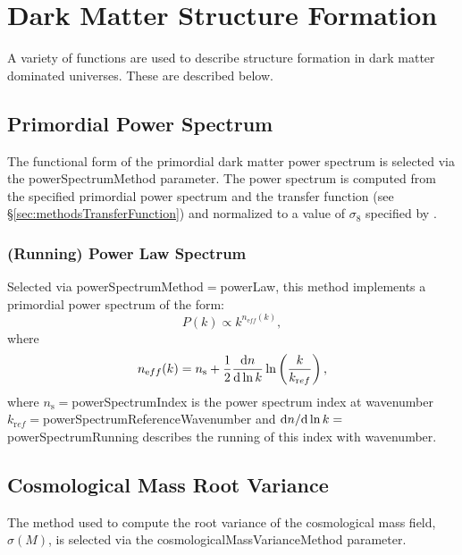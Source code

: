 \section{Dark Matter Structure Formation}

A variety of functions are used to describe structure formation in dark matter dominated universes. These are described below.

\subsection{Primordial Power Spectrum}\label{sec:PrimordialPowerSpectrum}

The functional form of the primordial dark matter power spectrum is selected via the {\normalfont \ttfamily powerSpectrumMethod} parameter. The power spectrum is computed from the specified primordial power spectrum and the transfer function (see \S\ref{sec:methodsTransferFunction}) and normalized to a value of $\sigma_8$ specified by {\normalfont \ttfamily [sigma\_8]}.

\subsubsection{(Running) Power Law Spectrum}

Selected via {\normalfont \ttfamily powerSpectrumMethod}$=${\normalfont \ttfamily powerLaw}, this method implements a primordial power spectrum of the form:
\begin{equation}
 P(k) \propto k^{n_{\mathrm eff}(k)},
\end{equation}
where
\begin{equation}
 n_{\mathrm eff}(k) = n_{\mathrm s} + {1\over 2}{\d n \over \d \ln k} \ln \left( {k \over k_{\mathrm ref}} \right),
\end{equation}
where $n_{\mathrm s}=${\normalfont \ttfamily powerSpectrumIndex} is the power spectrum index at wavenumber $k_{\mathrm ref}=${\normalfont \ttfamily powerSpectrumReferenceWavenumber} and $\d n / \d \ln k=${\normalfont \ttfamily powerSpectrumRunning} describes the running of this index with wavenumber.

\subsection{Cosmological Mass Root Variance}

The method used to compute the root variance of the cosmological mass field, $\sigma(M)$, is selected via the {\normalfont \ttfamily cosmologicalMassVarianceMethod} parameter.
